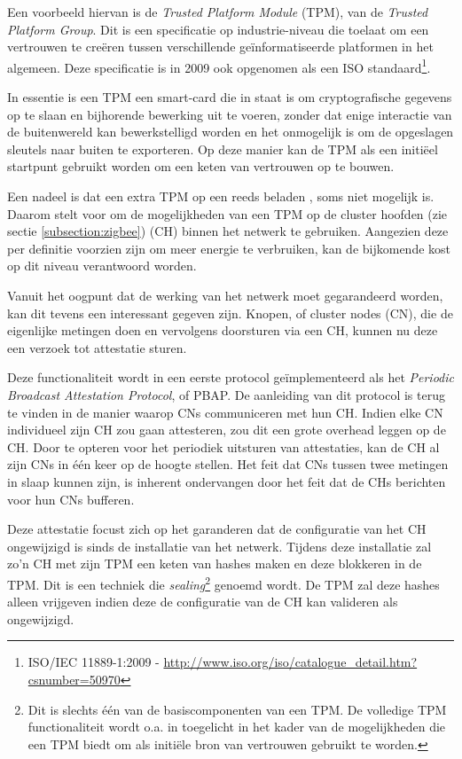 Een voorbeeld hiervan is de \emph{Trusted Platform Module} (TPM), van de
\emph{Trusted Platform Group}. Dit is een specificatie op industrie-niveau die
toelaat om een vertrouwen te cre\"eren tussen verschillende ge\"informatiseerde
platformen in het algemeen. Deze specificatie is in 2009 ook opgenomen als een
ISO standaard\footnote{ISO/IEC 11889-1:2009 -
\url{http://www.iso.org/iso/catalogue_detail.htm?csnumber=50970}}.

In essentie is een TPM een smart-card die in staat is om cryptografische
gegevens op te slaan en bijhorende bewerking uit te voeren, zonder dat enige
interactie van de buitenwereld kan bewerkstelligd worden en het onmogelijk is
om de opgeslagen sleutels naar buiten te exporteren. Op deze manier kan de TPM
als een initi\"eel startpunt gebruikt worden om een keten van vertrouwen op te
bouwen.

Een nadeel is dat een extra TPM op een reeds beladen \mcu, soms niet mogelijk
is. Daarom stelt \citep{krauss2007detecting} voor om de mogelijkheden van een
TPM op de cluster hoofden (zie sectie \ref{subsection:zigbee}) (CH) binnen het
netwerk te gebruiken. Aangezien deze per definitie voorzien zijn om meer
energie te verbruiken, kan de bijkomende kost op dit niveau verantwoord worden.

Vanuit het oogpunt dat de werking van het netwerk moet gegarandeerd worden, kan
dit tevens een interessant gegeven zijn. Knopen, of cluster nodes (CN), die de
eigenlijke metingen doen en vervolgens doorsturen via een CH, kunnen nu deze
een verzoek tot attestatie sturen.

Deze functionaliteit wordt in een eerste protocol ge\"implementeerd als het
\emph{Periodic Broadcast Attestation Protocol}, of PBAP. De aanleiding van dit
protocol is terug te vinden in de manier waarop CNs communiceren met hun CH.
Indien elke CN individueel zijn CH zou gaan attesteren, zou dit een grote
overhead leggen op de CH. Door te opteren voor het periodiek uitsturen van
attestaties, kan de CH al zijn CNs in \'e\'en keer op de hoogte stellen. Het
feit dat CNs tussen twee metingen in slaap kunnen zijn, is inherent ondervangen
door het feit dat de CHs berichten voor hun CNs bufferen.

Deze attestatie focust zich op het garanderen dat de configuratie van het CH
ongewijzigd is sinds de installatie van het netwerk. Tijdens deze installatie
zal zo'n CH met zijn TPM een keten van hashes maken en deze blokkeren in de
TPM. Dit is een techniek die \emph{sealing}\footnote{Dit is slechts \'e\'en van
de basiscomponenten van een TPM. De volledige TPM functionaliteit wordt o.a. in
\citep{parno2010bootstrapping} toegelicht in het kader van de mogelijkheden die
een TPM biedt om als initi\"ele bron van vertrouwen gebruikt te worden.}
genoemd wordt. De TPM zal deze hashes alleen vrijgeven indien deze de
configuratie van de CH kan valideren als ongewijzigd.

